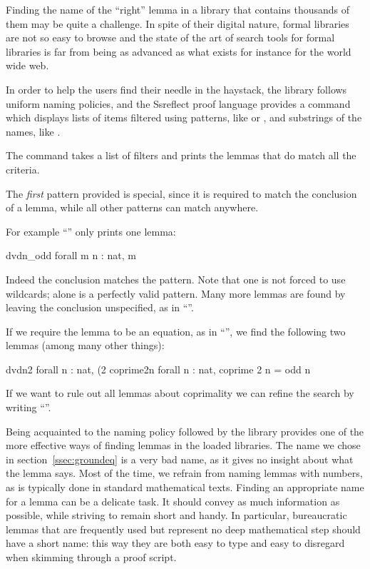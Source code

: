 Finding the name of the ``right'' lemma in a library that contains
thousands of them may be quite a challenge. In spite of their digital
nature, formal libraries are not so easy to browse and the state
of the art of search tools for formal libraries is far from being as
advanced as what exists for instance for the world wide web.

In order to help the users find their needle in the haystack,
the \mcbMC{} library follows uniform naming policies, and the Ssreflect
proof language provides a  command which displays lists of
items filtered using patterns, like \C{(_ * _ + _)}
or , and substrings of the names, like .



The  command takes a list of filters and prints the lemmas
that do match all the criteria.

The \emph{first} pattern provided is special, since it is required to match
the conclusion of a lemma, while all other patterns can match anywhere.

For example ``'' only prints one lemma:

\begin{coq}{}{}
dvdn_odd  forall m n : nat, m %
\end{coq}
Indeed the conclusion matches the pattern.  Note that one is not forced to
use wildcards;  alone is a perfectly valid pattern.  Many more
lemmas are found by leaving the conclusion unspecified,
as in ``''.

If we require the lemma to be an equation, as in ``'', we find
the following two lemmas (among many other things):

\begin{coqout}{}{}
dvdn2  forall n : nat, (2 %
coprime2n  forall n : nat, coprime 2 n = odd n
\end{coqout}
If we want to rule out all lemmas about coprimality we can refine the
search by writing ``''.


Being acquainted to the naming policy followed by the \mcbMC{} library
provides one of the more effective ways of finding lemmas in the
loaded libraries. The name   we chose in
section~\ref{ssec:groundeq} is a very bad name, as it gives no
insight about what the lemma says. Most of the time, we
refrain  from naming lemmas with numbers, as is typically done in
standard mathematical texts. Finding an appropriate name for a
lemma can be a delicate task. It should convey as much information as
possible, while striving to remain short and handy. In particular,
bureaucratic lemmas that are frequently used but represent no deep
mathematical step should have a short name: this way they are both
easy to type and easy to disregard when skimming through a proof
script.

